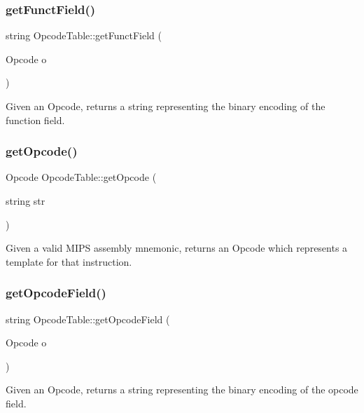 \subsubsection{\texorpdfstring{get\+Funct\+Field()}{getFunctField()}}
{\footnotesize\ttfamily string Opcode\+Table\+::get\+Funct\+Field (\begin{DoxyParamCaption}\item[{Opcode}]{o }\end{DoxyParamCaption})}

Given an Opcode, returns a string representing the binary encoding of the function field. \mbox{\label{class_opcode_table_a0710950ceccf23e2e13d34ff51b332ce}} 
\subsubsection{\texorpdfstring{get\+Opcode()}{getOpcode()}}
{\footnotesize\ttfamily Opcode Opcode\+Table\+::get\+Opcode (\begin{DoxyParamCaption}\item[{string}]{str }\end{DoxyParamCaption})}

Given a valid M\+I\+PS assembly mnemonic, returns an Opcode which represents a template for that instruction. \mbox{\label{class_opcode_table_af89738c82bb2406fa8eadf1639a86218}} 
\subsubsection{\texorpdfstring{get\+Opcode\+Field()}{getOpcodeField()}}
{\footnotesize\ttfamily string Opcode\+Table\+::get\+Opcode\+Field (\begin{DoxyParamCaption}\item[{Opcode}]{o }\end{DoxyParamCaption})}

Given an Opcode, returns a string representing the binary encoding of the opcode field. \mbox{\label{class_opcode_table_a588c7ea7780c6186ea685b632b231d33}} 
